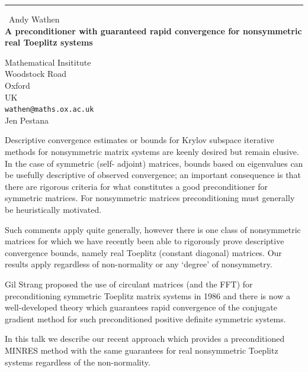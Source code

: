 \documentclass{report}
\begin{document}
\begin{center}
\rule{6in}{1pt} \
{\large Andy Wathen \\
{\bf A preconditioner with guaranteed rapid convergence for nonsymmetric real Toeplitz systems}}

Mathematical Insititute \\ Woodstock Road \\ Oxford \\ UK
\\
{\tt wathen@maths.ox.ac.uk}\\
Jen Pestana\end{center}

Descriptive convergence estimates or bounds for Krylov subspace
iterative methods for nonsymmetric matrix systems are keenly
desired but remain elusive. In the case of symmetric (self-
adjoint) matrices, bounds based on eigenvalues can be usefully
descriptive of observed convergence; an important consequence
is that there are rigorous criteria for what constitutes a
good preconditioner for symmetric matrices. For nonsymmetric
matrices preconditioning must generally be heuristically
motivated.

Such comments apply quite generally, however there is one class
of nonsymmetric matrices for which we have recently been able
to rigorously prove descriptive convergence bounds, namely real
Toeplitz (constant diagonal) matrices. Our results apply
regardless of non-normality or any `degree' of nonsymmetry.

Gil Strang proposed the use of circulant matrices (and the
FFT) for preconditioning symmetric Toeplitz matrix systems in
1986 and there is now a well-developed theory which guarantees
rapid convergence of the conjugate gradient method for such
preconditioned positive definite symmetric systems.

In this talk we describe our recent approach which provides a
preconditioned MINRES method with the same guarantees for real
nonsymmetric Toeplitz systems regardless of the non-normality.
\end{document}
